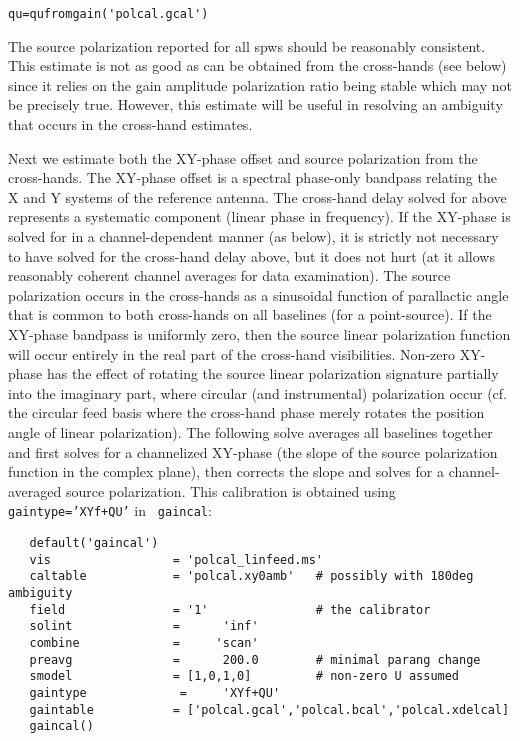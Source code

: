 \small
\begin{verbatim}
qu=qufromgain('polcal.gcal')
\end{verbatim}

\normalsize

The source polarization reported for all spws should be reasonably
consistent.  This estimate is not as good as can be obtained from
the cross-hands (see below) since it relies on the gain amplitude 
polarization ratio being stable which may not be precisely true.
However, this estimate will be useful in resolving an ambiguity
that occurs in the cross-hand estimates.

Next we estimate both the XY-phase offset and source polarization from
the cross-hands.  The XY-phase offset is a spectral phase-only
bandpass relating the X and Y systems of the reference antenna.  The
cross-hand delay solved for above represents a systematic component
(linear phase in frequency).  If the XY-phase is solved for in a
channel-dependent manner (as below), it is strictly not necessary to
have solved for the cross-hand delay above, but it does not hurt (at
it allows reasonably coherent channel averages for data examination).
The source polarization occurs in the cross-hands as a sinusoidal
function of parallactic angle that is common to both cross-hands on
all baselines (for a point-source).  If the XY-phase bandpass is
uniformly zero, then the source linear polarization function will
occur entirely in the real part of the cross-hand visibilities.
Non-zero XY-phase has the effect of rotating the source linear
polarization signature partially into the imaginary part, where
circular (and instrumental) polarization occur (cf. the circular feed
basis where the cross-hand phase merely rotates the position angle of
linear polarization).  The following solve averages all baselines
together and first solves for a channelized XY-phase (the slope of the
source polarization function in the complex plane), then corrects the
slope and solves for a channel-averaged source polarization.  This
calibration is obtained using {\tt gaintype='XYf+QU'} in {\tt
gaincal}:

\small
\begin{verbatim}
   default('gaincal')
   vis                 = 'polcal_linfeed.ms'
   caltable            = 'polcal.xy0amb'   # possibly with 180deg ambiguity
   field               = '1'               # the calibrator 
   solint              =      'inf'    
   combine             =     'scan' 
   preavg              =      200.0        # minimal parang change
   smodel              = [1,0,1,0]         # non-zero U assumed
   gaintype             =     'XYf+QU'        
   gaintable           = ['polcal.gcal','polcal.bcal','polcal.xdelcal]
   gaincal()
\end{verbatim}
\normalsize 

